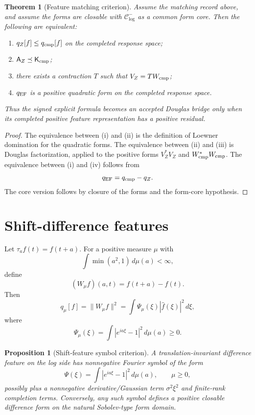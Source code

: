\documentclass[11pt]{article}
\newtheorem{theorem}{Theorem}
\newtheorem{proposition}{Proposition}
\newcommand{\AZ}{\mathsf A_Z}
\newcommand{\Kcmp}{\mathsf K_{\rm cmp}}
\newcommand{\Ccore}{\mathcal C^-_{\log}}
\newcommand{\Wcmp}{W_{\rm cmp}}
\begin{document}
\begin{theorem}[Feature matching criterion]
Assume the matching record above, and assume the forms are closable with \(\Ccore\) as a common form core. Then the following are equivalent:
\begin{enumerate}[label=(\roman*)]
\item \(q_Z[f]\le q_{\rm cmp}[f]\) on the completed response space;
\item \(\AZ\preceq\Kcmp\);
\item there exists a contraction \(T\) such that \(V_Z=T\Wcmp\);
\item \(q_{\rm EF}\) is a positive quadratic form on the completed response space.
\end{enumerate}
Thus the signed explicit formula becomes an accepted Douglas bridge only when its completed positive feature representation has a positive residual.
\end{theorem}

\begin{proof}
The equivalence between (i) and (ii) is the definition of Loewner domination for the quadratic forms. The equivalence between (ii) and (iii) is Douglas factorization, applied to the positive forms \(V_Z^*V_Z\) and \(\Wcmp^*\Wcmp\). The equivalence between (i) and (iv) follows from
\[
q_{\rm EF}=q_{\rm cmp}-q_Z.
\]
The core version follows by closure of the forms and the form-core hypothesis.
\end{proof}

\section{Shift-difference features}
Let \(\tau_a f(t)=f(t+a)\). For a positive measure \(\mu\) with
\[
\int \min(a^2,1)\,d\mu(a)<\infty,
\]
define
\[
(W_\mu f)(a,t)=f(t+a)-f(t).
\]
Then
\[
q_\mu[f]=\|W_\mu f\|^2
=\int \Psi_\mu(\xi)|\widehat f(\xi)|^2\,d\xi,
\]
where
\[
\Psi_\mu(\xi)=\int |e^{ia\xi}-1|^2\,d\mu(a)\ge0.
\]

\begin{proposition}[Shift-feature symbol criterion]
A translation-invariant difference feature on the log side has nonnegative Fourier symbol of the form
\[
\Psi(\xi)=\int |e^{ia\xi}-1|^2\,d\mu(a),
\qquad \mu\ge0,
\]
possibly plus a nonnegative derivative/Gaussian term \(\sigma^2\xi^2\) and finite-rank completion terms. Conversely, any such symbol defines a positive closable difference form on the natural Sobolev-type form domain.
\end{proposition}
\end{document}
